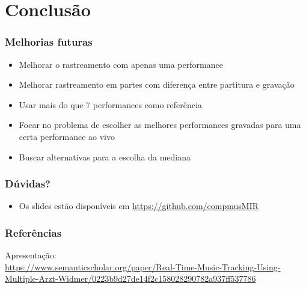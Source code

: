 \documentclass[serif,mathserif]{beamer}
\begin{document}
\section{Conclusão}
\begin{frame}
  \frametitle{Melhorias futuras}
  \begin{itemize}
    \item Melhorar o rastreamento com apenas uma performance\pause
    \item Melhorar rastreamento em partes com diferença entre partitura e gravação \pause
    \item Usar mais do que 7 performances como referência \pause
    \item Focar no problema de escolher as melhores performances gravadas para uma certa performance ao vivo \pause
    \item Buscar alternativas para a escolha da mediana
  \end{itemize}
\end{frame}

\begin{frame}
  \frametitle{Dúvidas?}
  \begin{itemize}
    \item Os slides estão disponíveis em \url{https://github.com/compmusMIR}
  \end{itemize}
\end{frame}

\begin{frame}
  \frametitle{Referências}
  \small
  Apresentação:\\
  \vspace{2mm}
  \url{https://www.semanticscholar.org/paper/Real-Time-Music-Tracking-Using-Multiple-Arzt-Widmer/0223b9d27de14f2c158028290782a937ff537786}


\end{frame}
\end{document}
